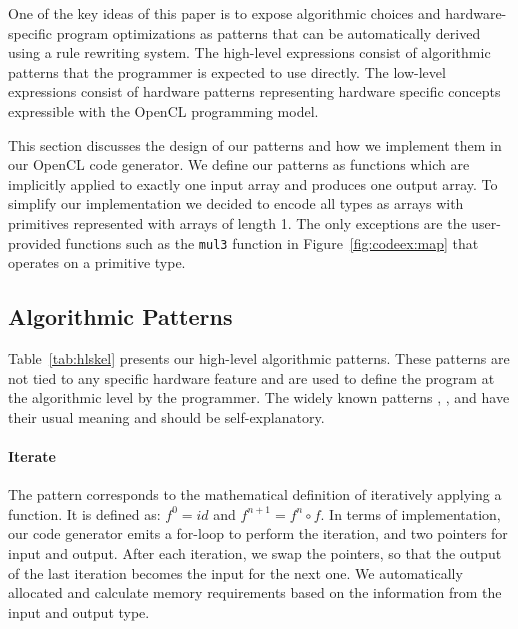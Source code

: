One of the key ideas of this paper is to expose algorithmic choices and hardware-specific program optimizations as patterns that can be automatically derived using a rule rewriting system.
The high-level expressions consist of algorithmic patterns that the programmer is expected to use directly.
The low-level expressions consist of hardware patterns representing hardware specific concepts expressible with the OpenCL programming model.

This section discusses the design of our patterns and how we implement them in our OpenCL code generator.
We define our patterns as functions which are implicitly applied to exactly one input array and produces one output array.
To simplify our implementation we decided to encode all types as arrays with primitives represented with arrays of length 1.
The only exceptions are the user-provided functions such as the \texttt{mul3} function in Figure~\ref{fig:codeex:map} that operates on a primitive type.


\subsection{Algorithmic Patterns}

Table~\ref{tab:hlskel} presents our high-level algorithmic patterns.
These patterns are not tied to any specific hardware feature and are used to define the program at the algorithmic level by the programmer.
The widely known patterns , , and  have their usual meaning and should be self-explanatory.
 
\paragraph{Iterate}
The  pattern corresponds to the mathematical definition of iteratively applying a function.
It is defined as: {$f^0 = id$} and {$f^{n+1} = f^n \circ f$}.
In terms of implementation, our code generator emits a for-loop to perform the iteration, and two pointers for input and output.
After each iteration, we swap the pointers, so that the output of the last iteration becomes the input for the next one.
We automatically allocated and calculate memory requirements based on the information from the input and output type.

